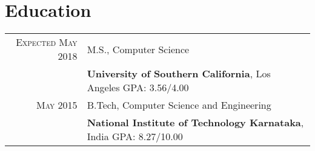 \section{Education}
\begin{tabular}{rl}

\textsc{Expected May 2018} & M.S., Computer Science\\
&\textbf{University of Southern California}, Los Angeles\hspace{2.9cm} 
GPA: 3.56/4.00
\vspace{0.2cm}
\\    
\textsc{May} 2015 & B.Tech, Computer Science and Engineering \\
&\textbf{National Institute of Technology Karnataka}, India\hspace{2cm} GPA: 8.27/10.00
\end{tabular}
\vspace{5pt}